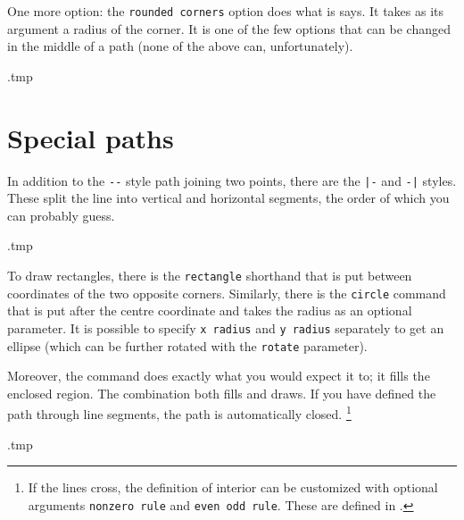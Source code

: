 One more option: the \verb|rounded corners| option does what is says.
It takes as its argument a radius of the corner.
It is one of the few options that can be changed in the middle of a path
(none of the above can, unfortunately).
%
\begin{VerbatimOut}{\jobname.tmp}
\end{VerbatimOut}
\ShowExample



%
%
%
\section{Special paths}

In addition to the \verb|--| style path joining two points,
there are the \verb$|-$ and \verb$-|$ styles.
These split the line into vertical and horizontal segments,
the order of which you can probably guess.
%
\begin{VerbatimOut}{\jobname.tmp}
\end{VerbatimOut}
\ShowExample

To draw rectangles, there is the \verb|rectangle| shorthand
that is put between coordinates of the two opposite corners.
Similarly, there is the \verb|circle| command that is put after the centre coordinate
and takes the radius as an optional parameter.
It is possible to specify \verb|x radius| and \verb|y radius| separately to get an ellipse
(which can be further rotated with the \verb|rotate| parameter).

Moreover, the command  does exactly what you would expect it to;
it fills the enclosed region.
The combination  both fills and draws.
If you have defined the path through line segments,
the path is automatically closed.%
\footnote{If the lines cross, the definition of interior can be customized with optional arguments
\texttt{nonzero rule} and \texttt{even odd rule}.
These are defined in \cite[Section~15.5.2]{tikz}.}
%
\begin{VerbatimOut}{\jobname.tmp}
\centering
{}
\end{VerbatimOut}
\ShowExampleBelow[2]

